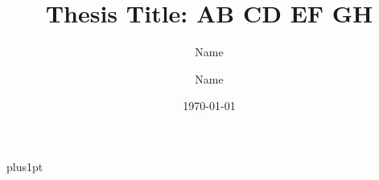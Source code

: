 \documentclass[12pt]{fulbrightthesis}
\title{ Thesis Title: AB CD EF GH }
\author{Name}
\date{\today}
\author{Name }             %
\begin{document}
\baselineskip=18pt plus1pt

\setcounter{secnumdepth}{3}
\setcounter{tocdepth}{3}


\maketitle                  %

\begin{romanpages}          %
\tableofcontents            %
\listoffigures              %
\end{romanpages}            %





\appendix




\printbibliography 
%
%
\end{document}
